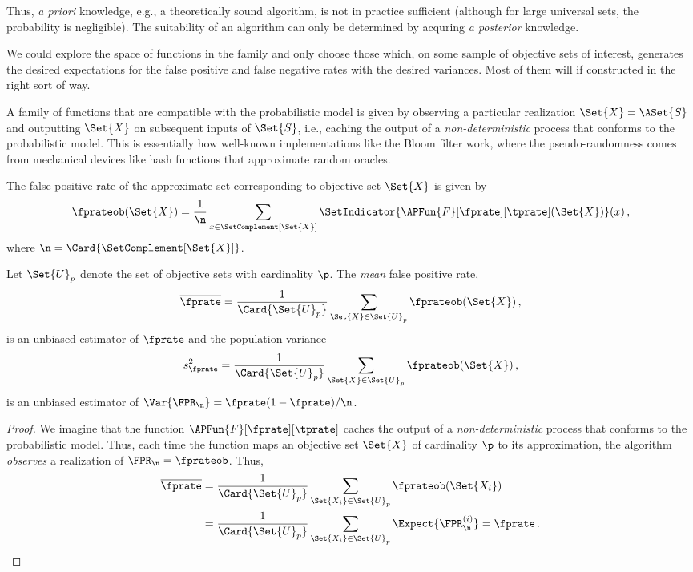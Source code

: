 \documentclass[ ../main.tex]{subfiles}
\newcommand{\ctor}[2]{\APFun{F}[#1][#2]}
\begin{document}
Thus, \emph{a priori} knowledge, e.g., a theoretically sound 
algorithm, is not in practice sufficient (although for large 
universal sets, the probability is negligible). The 
suitability of an algorithm can only be determined by 
acquring \emph{a posterior} knowledge.

We could explore the space of functions in the family and 
only choose those which, on some sample of objective sets of 
interest, generates the desired expectations for the false 
positive and false negative rates with the desired variances. 
Most of them will if constructed in the right sort of way.


A family of functions that are compatible with the 
probabilistic model is given by observing a particular 
realization $\Set{X} = \ASet{S}$ and outputting 
$\Set{X}$ on subsequent inputs of $\Set{S}$, i.e., caching 
the output of a \emph{non-deterministic} process that 
conforms to the probabilistic model. This is essentially how 
well-known implementations like the Bloom filter work, where 
the pseudo-randomness comes from mechanical devices like hash 
functions that approximate random oracles.

The false positive rate of the approximate set corresponding 
to objective set $\Set{X}$ is given by
\begin{equation}
    \fprateob(\Set{X}) = \frac{1}{\n} \sum_{x \in \SetComplement[\Set{X}]} \SetIndicator{\ctor{\fprate}{\tprate}(\Set{X})}(x)\,,
\end{equation}
where $\n = \Card{\SetComplement[\Set{X}]}$.

Let $\Set{U}_p$ denote the set of objective sets with cardinality $\p$. The 
\emph{mean} false positive rate,
\begin{equation}
    \overline{\fprate} = \frac{1}{\Card{\Set{U}_p}}
        \sum_{\Set{X} \in \Set{U}_p} \fprateob(\Set{X})\,,
\end{equation}
is an unbiased estimator of $\fprate$ and the population variance
\begin{equation}
    s^2_\fprate = \frac{1}{\Card{\Set{U}_p}}
        \sum_{\Set{X} \in \Set{U}_p} \fprateob(\Set{X})\,,
\end{equation}
is an unbiased estimator of $\Var{\FPR_\n} = \fprate(1-\fprate)/\n$.
\begin{proof}
We imagine that the function $\ctor{\fprate}{\tprate}$ caches the output of a \emph{non-deterministic} process that conforms to the probabilistic model.
Thus, each time the function maps an objective set $\Set{X}$ of cardinality $\p$ to its approximation, the algorithm \emph{observes} a realization of 
$\FPR_\n = \fprateob$.
Thus,
\begin{align}
    \overline{\fprate}
        &= \frac{1}{\Card{\Set{U}_p}} 
            \sum_{\Set{X_i} \in \Set{U}_p} \fprateob(\Set{X_i})\\
        &= \frac{1}{\Card{\Set{U}_p}} 
            \sum_{\Set{X_i} \in \Set{U}_p} \Expect{\FPR_\n^{(i)}} = \fprate\,.
\end{align}
\end{proof}
\end{document}
